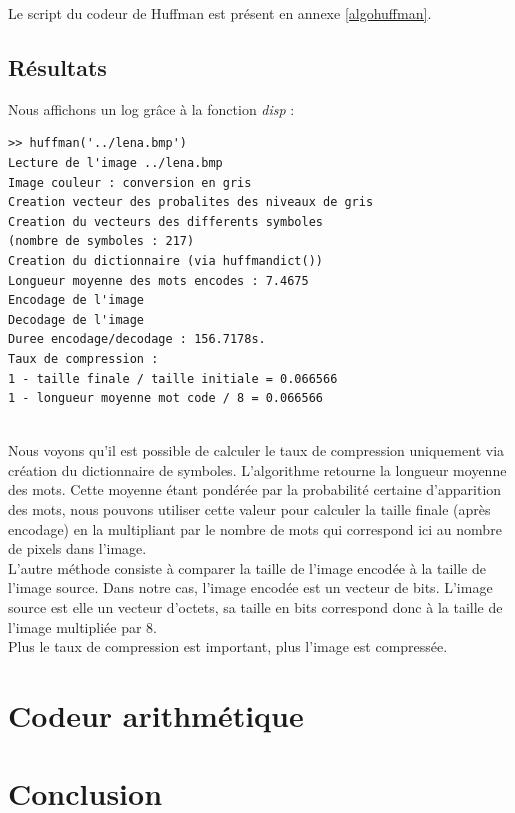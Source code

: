 \documentclass[a4paper, 12pt]{article}
\begin{document}
Le script du codeur de Huffman est présent en annexe \ref{algohuffman}.


\subsection{Résultats}

Nous affichons un log grâce à la fonction \textit{disp} :

\begin{verbatim}
>> huffman('../lena.bmp')
Lecture de l'image ../lena.bmp
Image couleur : conversion en gris
Creation vecteur des probalites des niveaux de gris
Creation du vecteurs des differents symboles
(nombre de symboles : 217)
Creation du dictionnaire (via huffmandict())
Longueur moyenne des mots encodes : 7.4675
Encodage de l'image
Decodage de l'image
Duree encodage/decodage : 156.7178s.
Taux de compression : 
1 - taille finale / taille initiale = 0.066566
1 - longueur moyenne mot code / 8 = 0.066566
\end{verbatim}

\\

Nous voyons qu'il est possible de calculer le taux de compression uniquement via création du dictionnaire de symboles. L'algorithme retourne la longueur moyenne des mots. Cette moyenne étant pondérée par la probabilité certaine d'apparition des mots, nous pouvons utiliser cette valeur pour calculer la taille finale (après encodage) en la multipliant par le nombre de mots qui correspond ici au nombre de pixels dans l'image.\\

L'autre méthode consiste à comparer la taille de l'image encodée à la taille de l'image source. Dans notre cas, l'image encodée est un vecteur de bits. L'image source est elle un vecteur d'octets, sa taille en bits correspond donc à la taille de l'image multipliée par 8.\\

Plus le taux de compression est important, plus l'image est compressée. \\


\section{Codeur arithmétique}



\section{Conclusion}
\end{document}
